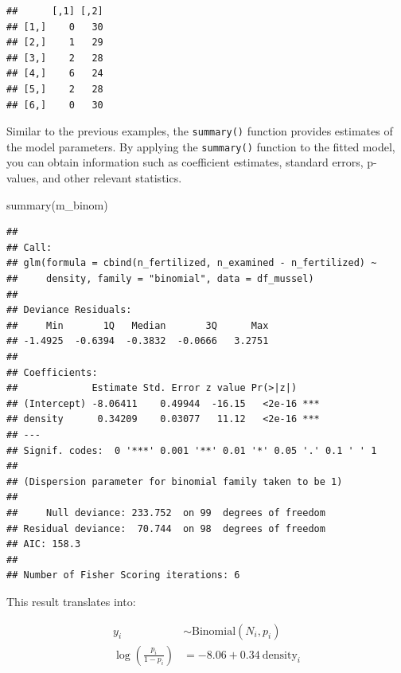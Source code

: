 \documentclass[
]{book}
\newenvironment{Shaded}{\begin{snugshade}}{\end{snugshade}}
\newcommand{\FunctionTok}[1]{\textcolor[rgb]{0.00,0.00,0.00}{#1}}
\newcommand{\NormalTok}[1]{#1}
\newcommand{\SpecialCharTok}[1]{\textcolor[rgb]{0.00,0.00,0.00}{#1}}
\begin{document}
\begin{Shaded}
\end{Shaded}

\begin{verbatim}
##      [,1] [,2]
## [1,]    0   30
## [2,]    1   29
## [3,]    2   28
## [4,]    6   24
## [5,]    2   28
## [6,]    0   30
\end{verbatim}

Similar to the previous examples, the \texttt{summary()} function provides estimates of the model parameters. By applying the \texttt{summary()} function to the fitted model, you can obtain information such as coefficient estimates, standard errors, p-values, and other relevant statistics.

\begin{Shaded}
\begin{Highlighting}[]
\FunctionTok{summary}\NormalTok{(m\_binom)}
\end{Highlighting}
\end{Shaded}

\begin{verbatim}
## 
## Call:
## glm(formula = cbind(n_fertilized, n_examined - n_fertilized) ~ 
##     density, family = "binomial", data = df_mussel)
## 
## Deviance Residuals: 
##     Min       1Q   Median       3Q      Max  
## -1.4925  -0.6394  -0.3832  -0.0666   3.2751  
## 
## Coefficients:
##             Estimate Std. Error z value Pr(>|z|)    
## (Intercept) -8.06411    0.49944  -16.15   <2e-16 ***
## density      0.34209    0.03077   11.12   <2e-16 ***
## ---
## Signif. codes:  0 '***' 0.001 '**' 0.01 '*' 0.05 '.' 0.1 ' ' 1
## 
## (Dispersion parameter for binomial family taken to be 1)
## 
##     Null deviance: 233.752  on 99  degrees of freedom
## Residual deviance:  70.744  on 98  degrees of freedom
## AIC: 158.3
## 
## Number of Fisher Scoring iterations: 6
\end{verbatim}

This result translates into:

\[
\begin{aligned}
y_i &\sim \text{Binomial}(N_i, p_i)\\
\log(\frac{p_i}{1 - p_i}) &= -8.06 + 0.34~\text{density}_i
\end{aligned}
\]
\end{document}
